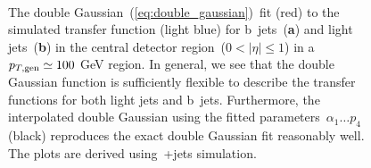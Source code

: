 \begin{figure}
\begin{centering}
 \\
\caption[The double-Gaussian transfer function fit in~\ttbar~simulation.]{The double Gaussian~(\cref{eq:double_gaussian})~fit (red) to the simulated transfer function (light blue) for b~jets~(\textbf{a}) and light jets~(\textbf{b}) in the central detector region~($0 < |\eta| \le 1$) in a~$p_{T,\mathrm{gen}} \simeq 100$ GeV region. In general, we see that the double Gaussian function is sufficiently flexible to describe the transfer functions for both light jets and b~jets. Furthermore, the interpolated double Gaussian using the fitted parameters~$\alpha_1 \dots p_4$ (black) reproduces the exact double Gaussian fit reasonably well. The plots are derived using~\ttbar+jets simulation.}
\label{fig:transfer_perbin}
\end{centering}
\end{figure}

